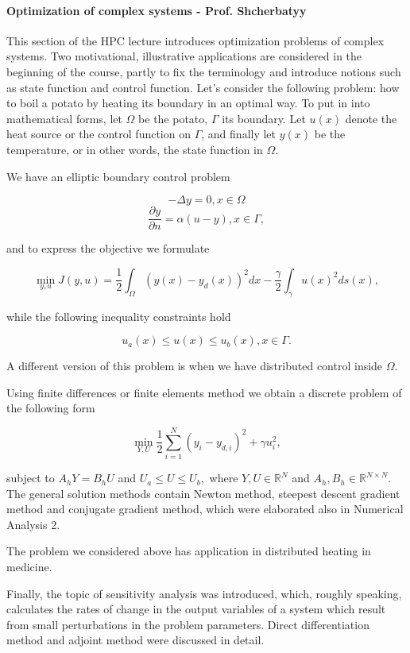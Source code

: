 \documentclass{article}
\begin{document}
\paragraph{Optimization of complex systems - Prof. Shcherbatyy}
This section of the HPC lecture introduces optimization problems of complex systems. Two motivational, illustrative applications are considered in the beginning of the course, partly to fix the terminology and introduce notions such as state function and control function. Let's consider the following problem: how to boil a potato by heating its boundary in an optimal way. To put in into mathematical forms, let $\Omega$ be the potato, $\Gamma$ its boundary. Let $u(x)$ denote the heat source or the control function on $\Gamma$, and finally let $y(x)$ be the temperature, or in other words, the state function in $\Omega$.

We have an elliptic boundary control problem

\[ -\Delta y = 0 , x \in \Omega \]
\[ \frac{\partial y}{\partial n} = \alpha (u - y), x \in \Gamma, \]

and to express the objective we formulate

\[ \min_{y,u} J(y, u) = \frac{1}{2} \int_{\Omega} (y(x) - y_d(x))^2 dx - \frac{\gamma}{2} \int_{\gamma} {u(x)}^2 ds(x),\]

while the following inequality constraints hold

\[ u_a(x) \leq u(x) \leq u_b(x), x \in \Gamma.\]

A different version of this problem is when we have distributed control inside $\Omega$.

Using finite differences or finite elements method we obtain a discrete problem of the following form

\[ \min_{Y,U} \frac{1}{2}\sum_{i = 1} ^ {N} (y_i - y_{d,i})^2 + \gamma u_i^2,\]

subject to $A_h Y = B_h U$ and $U_a \leq U \leq U_b,$ where $Y,U \in \mathbb{R}^N$ and $A_h, B_h \in \mathbb{R}^{N \times N}$. The general solution methods contain Newton method, steepest descent gradient method and conjugate gradient method, which were elaborated also in Numerical Analysis 2.

The problem we considered above has application in distributed heating in medicine.

Finally, the topic of sensitivity analysis was introduced, which, roughly speaking, calculates the rates of change in the output variables of a system which result from small perturbations in the problem parameters. Direct differentiation method and adjoint method were discussed in detail.
\end{document}
